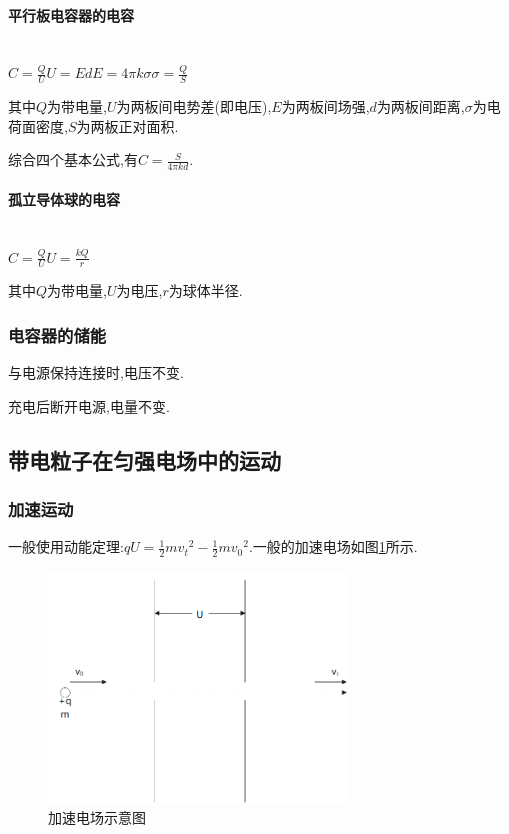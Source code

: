\paragraph{平行板电容器的电容}\ \\


\qquad$C=\frac{Q}{U}$\qquad$U=Ed$\qquad$E=4\pi k\sigma$\qquad$\sigma=\frac{Q}{S}$


其中$Q$为带电量,$U$为两板间电势差(即电压),$E$为两板间场强,$d$为两板间距离,$\sigma$为电荷面密度,$S$为两板正对面积.


综合四个基本公式,有$C=\frac{S}{4\pi kd}$.
\paragraph{孤立导体球的电容}\ \\
\qquad$C=\frac{Q}{U}$\qquad$U=\frac{kQ}{r}$


其中$Q$为带电量,$U$为电压,$r$为球体半径.
\subsubsection{电容器的储能}
\begin{td}
与电源保持连接时,电压不变.
\end{td}\begin{td}充电后断开电源,电量不变.\end{td}
\subsection{带电粒子在匀强电场中的运动}
\subsubsection{加速运动}
一般使用动能定理:$qU=\frac12m{v_t}^2-\frac12m{v_0}^2$.一般的加速电场如图\ref{jsdc}所示.\begin{figure}[htp]\centering\includegraphics[width=8cm]{11-1}\caption[加速电场示意图]{加速电场示意图}\label{jsdc} \end{figure}
